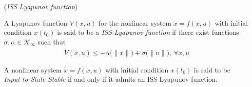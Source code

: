 \begin{bw_box}
\begin{definition}\cite{Sontag2008} (\textit{ISS Lyapunov function})
\label{def:ISS_Lyapunov}

  A Lyapunov function $V(x,u)$ for the nonlinear system $\dot{x} = f(x,u)$
  with initial condition $x(t_0)$ is said to be a \textit{ISS-Lyapunov function}
  if there exist functions $\sigma, \alpha \in \mathcal{K}_{\infty}$ such that
  \begin{align}
    \dot{V}(x,u) \leq -\alpha\big(\|x\|\big) + \sigma\big(\|u\|\big),\ \forall x,u
  \end{align}
\end{definition}
\end{bw_box}

\begin{bw_box}
\begin{theorem}\cite{Sontag2008}
\label{def:ISS_Lyapunov_admit_theorem}

  A nonlinear system $\dot{x} = f(x,u)$ with initial condition $x(t_0)$ is said
  to be \textit{Input-to-State Stable} if and only if it admits an
  ISS-Lyapunov function.
\end{theorem}
\end{bw_box}
